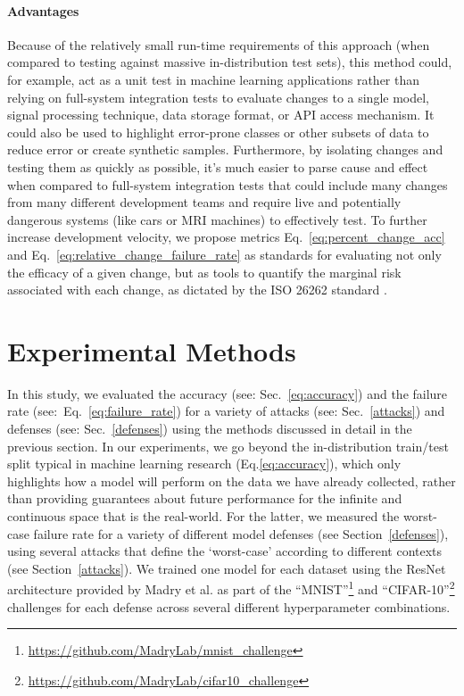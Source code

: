 \documentclass[journal]{IEEEtran}
\begin{document}
\paragraph{Advantages}
Because of the relatively small run-time requirements of this approach (when compared to testing against massive in-distribution test sets), this method could, for example, act as a unit test in machine learning applications rather than relying on full-system integration tests to evaluate changes to a single model, signal processing technique, data storage format, or API access mechanism. It could also be used to highlight error-prone classes or other subsets of data to reduce error or create synthetic samples. Furthermore, by isolating changes and testing them as quickly as possible, it's much easier to parse cause and effect when compared to full-system integration tests that could include many changes from many different development teams and require live and potentially dangerous systems (like cars or MRI machines) to effectively test. To further increase development velocity, we propose metrics Eq.~\ref{eq:percent_change_acc} and Eq.~\ref{eq:relative_change_failure_rate} as standards for evaluating not only the efficacy of a given change, but as tools to quantify the marginal risk associated with each change, as dictated by the ISO 26262 standard \cite{iso26262}.

\section{Experimental Methods}

\label{methods}
In this study, we evaluated the accuracy (see: Sec.~\ref{eq:accuracy}) and the failure rate (see:~Eq.~\ref{eq:failure_rate}) for a variety of attacks (see: Sec.~\ref{attacks}) and defenses (see: Sec.~\ref{defenses}) using the methods discussed in detail in the previous section. In our experiments, we go beyond the in-distribution train/test split typical in machine learning research (Eq.\ref{eq:accuracy}), which only highlights how a model will perform on the data we have already collected, rather than providing guarantees about future performance for the infinite and continuous space that is the real-world. For the latter, we measured the worst-case failure rate for a variety of different model defenses (see Section~\ref{defenses}), using several attacks that define the ‘worst-case’ according to different contexts (see Section~\ref{attacks}). We trained one model for each dataset using the ResNet~\cite{resnet} architecture provided by Madry et al. as part of the ``MNIST''\footnote{\href{https://github.com/MadryLab/mnist_challenge}{https://github.com/MadryLab/mnist\_challenge}} and ``CIFAR-10''\footnote{\href{https://github.com/MadryLab/cifar10_challenge}{https://github.com/MadryLab/cifar10\_challenge}} challenges for each defense across several different hyperparameter combinations. 
\end{document}
